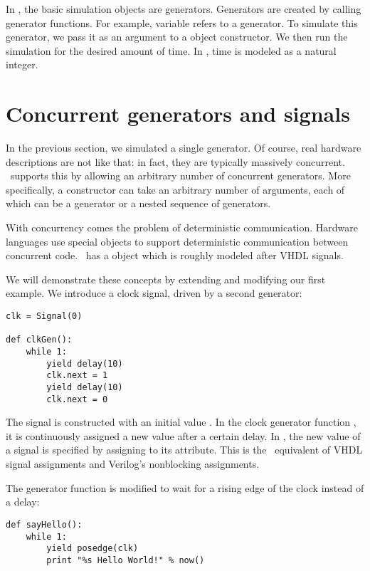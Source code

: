 In \myhdl{}, the basic simulation objects are generators. Generators
are created by calling generator functions. For example, variable
 refers to a generator. To simulate this generator, we pass
it as an argument to a  object constructor.  We then
run the simulation for the desired amount of time. In \myhdl{}, time
is modeled as a natural integer.


\section{Concurrent generators and signals}

In the previous section, we simulated a single generator. Of course,
real hardware descriptions are not like that: in fact, they are
typically massively concurrent. \myhdl\ supports this by allowing an
arbitrary number of concurrent generators. More specifically, a
 constructor can take an arbitrary number of
arguments, each of which can be a generator or a nested sequence of
generators.

With concurrency comes the problem of deterministic
communication. Hardware languages use special objects to
support deterministic communication between concurrent code. \myhdl\
has a  object which is roughly modeled after VHDL
signals.

We will demonstrate these concepts by extending and modifying our
first example. We introduce a clock signal, driven by a second
generator: 

\begin{verbatim}
clk = Signal(0)

def clkGen():
    while 1:
        yield delay(10)
        clk.next = 1
        yield delay(10)
        clk.next = 0
\end{verbatim}

The  signal is constructed with an initial value
. In the clock generator function , it is
continuously assigned a new value after a certain delay. In \myhdl{},
the new value of a signal is specified by assigning to its
 attribute. This is the \myhdl\ equivalent of VHDL signal
assignments and Verilog's nonblocking assignments.

The  generator function is modified to wait for a
rising edge of the clock instead of a delay:

\begin{verbatim}
def sayHello():
    while 1:
        yield posedge(clk)
        print "%s Hello World!" % now()
\end{verbatim}


